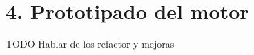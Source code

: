 \chapter*{4. Prototipado del motor}\label{cap:prototype}

TODO Hablar de los refactor y mejoras



\emptyPage